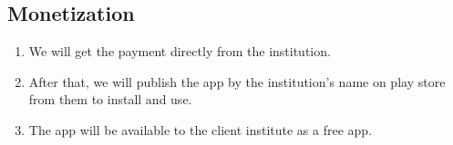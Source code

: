 \subsection{Monetization}
\begin{enumerate}
    \item We will get the payment directly from the institution.
    \item After that, we will publish the app by the institution's name on play store from them to install and use.
    \item The app will be available to the client institute as a free app.
\end{enumerate}